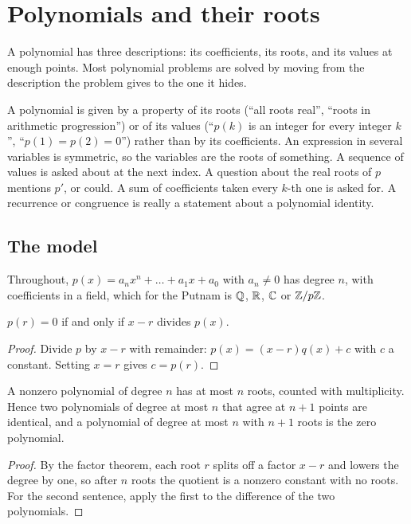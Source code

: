 \section{Polynomials and their roots}
\label{sec:polynomials}

A polynomial has three descriptions: its coefficients, its roots, and its values at enough points. Most polynomial problems are solved by moving from the description the problem gives to the one it hides.

\begin{recognise}
A polynomial is given by a property of its roots (``all roots real'', ``roots in arithmetic progression'') or of its values (``$p(k)$ is an integer for every integer $k$'', ``$p(1) = p(2) = 0$'') rather than by its coefficients. An expression in several variables is symmetric, so the variables are the roots of something. A sequence of values is asked about at the next index. A question about the real roots of $p$ mentions $p'$, or could. A sum of coefficients taken every $k$-th one is asked for. A recurrence or congruence is really a statement about a polynomial identity.
\end{recognise}

\subsection*{The model}

Throughout, $p(x) = a_n x^n + \dots + a_1 x + a_0$ with $a_n \ne 0$ has degree $n$, with coefficients in a field, which for the Putnam is $\mathbb{Q}$, $\mathbb{R}$, $\mathbb{C}$ or $\mathbb{Z}/p\mathbb{Z}$.

\begin{theorem}
$p(r) = 0$ if and only if $x - r$ divides $p(x)$.
\end{theorem}

\begin{proof}
Divide $p$ by $x - r$ with remainder: $p(x) = (x - r) q(x) + c$ with $c$ a constant. Setting $x = r$ gives $c = p(r)$.
\end{proof}

\begin{theorem}
A nonzero polynomial of degree $n$ has at most $n$ roots, counted with multiplicity. Hence two polynomials of degree at most $n$ that agree at $n + 1$ points are identical, and a polynomial of degree at most $n$ with $n+1$ roots is the zero polynomial.
\end{theorem}

\begin{proof}
By the factor theorem, each root $r$ splits off a factor $x - r$ and lowers the degree by one, so after $n$ roots the quotient is a nonzero constant with no roots. For the second sentence, apply the first to the difference of the two polynomials.
\end{proof}

